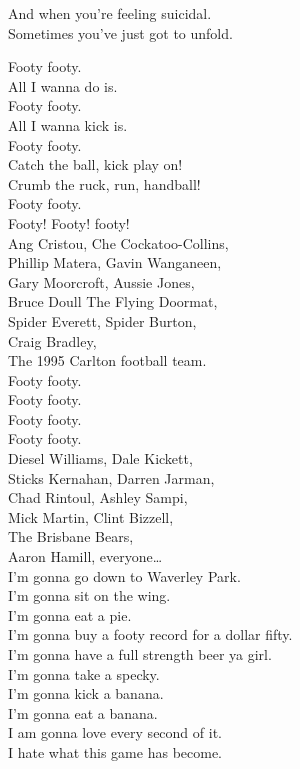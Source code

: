 And when you're feeling suicidal. \\
Sometimes you've just got to unfold. \\




Footy footy. \\
All I wanna do is. \\
Footy footy. \\
All I wanna kick is. \\
Footy footy. \\
Catch the ball, kick play on! \\
Crumb the ruck, run, handball! \\
Footy footy. \\
Footy! Footy! footy! \\

Ang Cristou, Che Cockatoo-Collins, \\
Phillip Matera, Gavin Wanganeen, \\
Gary Moorcroft, Aussie Jones, \\
Bruce Doull The Flying Doormat, \\
Spider Everett, Spider Burton, \\
Craig Bradley, \\
The 1995 Carlton football team. \\

Footy footy. \\
Footy footy. \\
Footy footy. \\
Footy footy. \\

Diesel Williams, Dale Kickett, \\
Sticks Kernahan, Darren Jarman, \\
Chad Rintoul, Ashley Sampi, \\
Mick Martin, Clint Bizzell, \\
The Brisbane Bears, \\
Aaron Hamill, everyone… \\

I'm gonna go down to Waverley Park. \\
I'm gonna sit on the wing. \\
I'm gonna eat a pie. \\
I'm gonna buy a footy record for a dollar fifty. \\
I'm gonna have a full strength beer ya girl. \\
I'm gonna take a specky. \\
I'm gonna kick a banana. \\
I'm gonna eat a banana. \\
I am gonna love every second of it. \\
I hate what this game has become. \\
